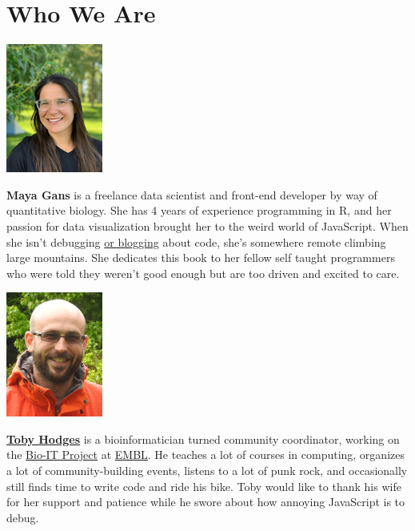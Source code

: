 \section{Who We Are}\label{s:intro-contributors}

\begin{center}
  \includegraphics{figures/gans-maya.png}
\end{center}

\noindent
\textbf{Maya Gans} is a freelance data scientist and front-end developer by way of quantitative biology. 
She has 4 years of experience programming in R, 
and her passion for data visualization brought her to the weird world of JavaScript. 
When she isn't debugging \href{https://maya.rbind.io/}{or blogging} about code, 
she's somewhere remote climbing large mountains. 
She dedicates this book to her fellow self taught programmers who were told they weren’t good enough
but are too driven and excited to care.

\begin{center}
  \includegraphics{figures/hodges-toby.png}
\end{center}

\noindent
\textbf{\href{https://tbyhdgs.info/}{Toby Hodges}} is a bioinformatician turned community
coordinator, working on the \href{https://bio-it.embl.de}{Bio-IT Project} at
\href{https://www.embl.de}{EMBL}. He teaches a lot of courses in computing, organizes
a lot of community-building events, listens to a lot of punk rock, and
occasionally still finds time to write code and ride his bike. Toby would like
to thank his wife for her support and patience while he swore about how annoying
JavaScript is to debug.

